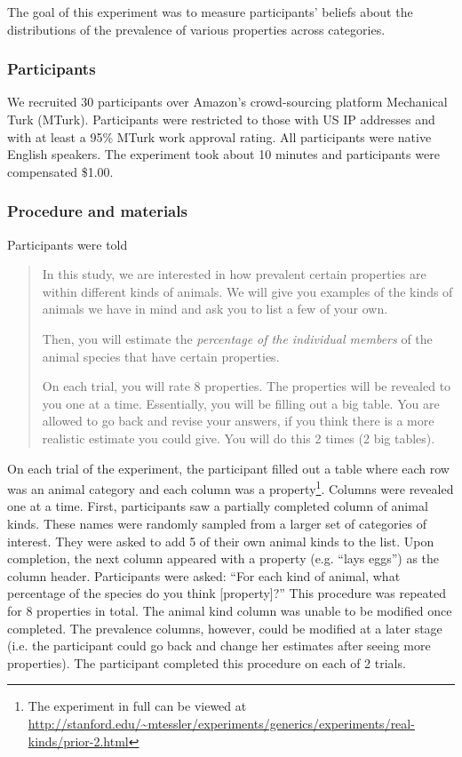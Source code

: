 \documentclass[10pt,letterpaper]{article}
\begin{document}
The goal of this experiment was to measure participants' beliefs about the distributions of the prevalence of various properties across categories.

\subsubsection{Participants}

We recruited 30 participants over Amazon's crowd-sourcing platform Mechanical Turk (MTurk).  Participants were restricted to those with US IP addresses and with at least a 95\% MTurk work approval rating. All participants were native English speakers. The experiment took about 10 minutes and participants were compensated \$1.00.

\subsubsection{Procedure and materials}

Participants were told 
\begin{quote}
In this study, we are interested in how prevalent certain properties are within different kinds of animals. We will give you examples of the kinds of animals we have in mind and ask you to list a few of your own.

Then, you will estimate the \emph{percentage of the individual members} of the animal species that have certain properties.

On each trial, you will rate 8 properties. The properties will be revealed to you one at a time. Essentially, you will be filling out a big table. You are allowed to go back and revise your answers, if you think there is a more realistic estimate you could give. You will do this 2 times (2 big tables). 

\end{quote}

On each trial of the experiment, the participant filled out a table where each row was an animal category and each column was a property\footnote{The experiment in full can be viewed at \url{http://stanford.edu/~mtessler/experiments/generics/experiments/real-kinds/prior-2.html}}. Columns were revealed one at a time. First, participants saw a partially completed column of animal kinds. These names were randomly sampled from a larger set of categories of interest. They were asked to add 5 of their own animal kinds to the list. Upon completion, the next column appeared with a property (e.g. ``lays eggs'') as the column header. Participants were asked: ``For each kind of animal, what percentage of the species do you think [property]?'' This procedure was repeated for 8 properties in total. The animal kind column was unable to be modified once completed. The prevalence columns, however, could be modified at a later stage (i.e. the participant could go back and change her estimates after seeing more properties). The participant completed this procedure on each of 2 trials.
\end{document}
